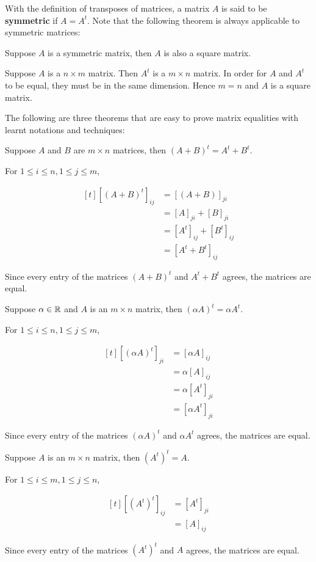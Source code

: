 \documentclass[a4paper,12pt]{article}
\begin{document}
With the definition of transposes of matrices, a matrix $A$ is said to be \textbf{symmetric} if $A=A^{t}$. Note that the following theorem is always applicable to symmetric matrices:\n

\begin{pst}
  Suppose $A$ is a symmetric matrix, then $A$ is also a square matrix.\n

  \prf Suppose $A$ is a $n\times m$ matrix. Then $A^{t}$ is a $m\times n$ matrix. In order for $A$ and $A^{t}$ to be equal, they must be in the same dimension. Hence $m=n$ and $A$ is a square matrix.
\end{pst}\n

The following are three theorems that are easy to prove matrix equalities with learnt notations and techniques:\n

\begin{pst}
  Suppose $A$ and $B$ are $m\times n$ matrices, then $(A+B)^{t}=A^{t}+B^{t}$.\n

  \prf For $1\leq i\leq n,1\leq j\leq m$,

  $$\begin{aligned}[t]
    [(A+B)^{t}]_{ij}&=[(A+B)]_{ji}\\
    &=[A]_{ji}+[B]_{ji}\\
    &=[A^{t}]_{ij}+[B^{t}]_{ij}\\
    &=[A^{t}+B^{t}]_{ij}
  \end{aligned}$$\s

  Since every entry of the matrices $(A+B)^{t}$ and $A^{t}+B^{t}$ agrees, the matrices are equal.
\end{pst}\n

\begin{pst}
  Suppose $\alpha\in\mathbb{R}$ and $A$ is an $m\times n$ matrix, then $(\alpha A)^{t}=\alpha A^{t}$.\n

  \prf For $1\leq i\leq n,1\leq j\leq m$,

  $$\begin{aligned}[t]
    [(\alpha A)^{t}]_{ji}&=[\alpha A]_{ij}\\
    &=\alpha[A]_{ij}\\
    &=\alpha[A^{t}]_{ji}\\
    &=[\alpha A^{t}]_{ji}
  \end{aligned}$$\s

  Since every entry of the matrices $(\alpha A)^{t}$ and $\alpha A^{t}$ agrees, the matrices are equal.
\end{pst}\n

\begin{pst}
  Suppose $A$ is an $m\times n$ matrix, then $(A^{t})^{t}=A$.\n

  \prf For $1\leq i\leq m,1\leq j\leq n$,

  $$\begin{aligned}[t]
    [(A^{t})^{t}]_{ij}&=[A^{t}]_{ji}\\
    &=[A]_{ij}
  \end{aligned}$$\s

  Since every entry of the matrices $(A^{t})^{t}$ and $A$ agrees, the matrices are equal.
\end{pst}\n
\end{document}
